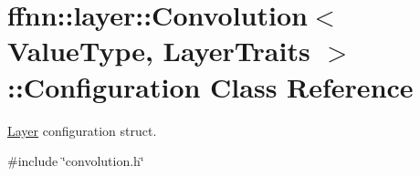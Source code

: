 \hypertarget{classffnn_1_1layer_1_1_convolution_1_1_configuration}{\section{ffnn\-:\-:layer\-:\-:Convolution$<$ Value\-Type, Layer\-Traits $>$\-:\-:Configuration Class Reference}
\label{classffnn_1_1layer_1_1_convolution_1_1_configuration}
}


\hyperlink{classffnn_1_1layer_1_1_layer}{Layer} configuration struct.  




{\ttfamily \#include \char`\"{}convolution.\-h\char`\"{}}


